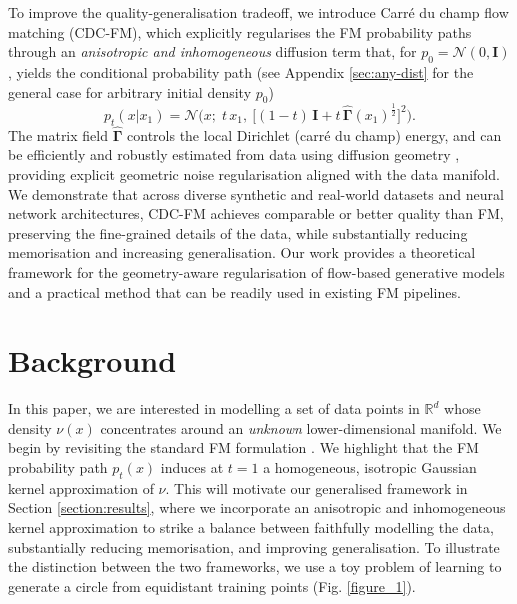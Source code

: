 \documentclass{article} %
\newcommand{\R}{\mathbb{R}}
\newcommand{\N}{\mathcal{N}}
\newcommand{\I}{\mathbf{I}}
\newcommand{\G}{\widehat{\mathbf{\Gamma}}}
\begin{document}
To improve the quality-generalisation tradeoff, we introduce Carr\'{e} du champ flow matching (CDC-FM), which explicitly regularises the FM probability paths through an \textit{anisotropic and inhomogeneous} diffusion term that, for $p_0=\N(0,\I)$, yields the conditional probability path (see Appendix \ref{sec:any-dist} for the general case for arbitrary initial density $p_0$)
%
\begin{equation} \label{eq:cdc_conditional_path}
    p_t(x| x_1)
=\mathcal{N}\Big(x;\; t\,x_1,\ \big[(1-t)\,\mathbf{I}+t\,\G(x_1)^{\frac12}\big]^2\Big).
\end{equation}
%
The matrix field $\G$ controls the local Dirichlet (carré du champ) energy, and can be efficiently and robustly estimated from data using diffusion geometry \citep{jones2024diffusion,jones2024manifold,jones2026computing}, providing explicit geometric noise regularisation aligned with the data manifold.
We demonstrate that across diverse synthetic and real-world datasets and neural network architectures, CDC-FM achieves comparable or better quality than FM, preserving the fine-grained details of the data, while substantially reducing memorisation and increasing generalisation.
Our work provides a theoretical framework for the geometry-aware regularisation of flow-based generative models and a practical method that can be readily used in existing FM pipelines.


\section{Background}

In this paper, we are interested in modelling a set of data points in $\R^d$ whose density $\nu(x)$ concentrates around an \textit{unknown} lower-dimensional manifold.
We begin by revisiting the standard FM formulation \citep{lipman2023flow}. We highlight that the FM probability path $p_t(x)$ induces at $t=1$ a homogeneous, isotropic Gaussian kernel approximation of $\nu$.
This will motivate our generalised framework in Section \ref{section:results}, where we incorporate an anisotropic and inhomogeneous kernel approximation to strike a balance between faithfully modelling the data, substantially reducing memorisation, and improving generalisation. 
To illustrate the distinction between the two frameworks, we use a toy problem of learning to generate a circle from equidistant training points (Fig. \ref{figure_1}).
\end{document}
